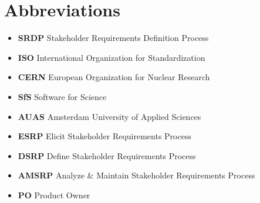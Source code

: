 \documentclass[conference]{IEEEtran}
\begin{document}




\section*{Abbreviations}

\begin{itemize}
	\item \textbf{SRDP} Stakeholder Requirements Definition Process
	\item \textbf{ISO} International Organization for Standardization
	\item \textbf{CERN} European Organization for Nuclear Research
	\item \textbf{SfS} Software for Science
	\item \textbf{AUAS} Amsterdam University of Applied Sciences
	\item \textbf{ESRP} Elicit Stakeholder Requirements Process
	\item \textbf{DSRP} Define Stakeholder Requirements Process
	\item \textbf{AMSRP} Analyze \& Maintain Stakeholder Requirements Process
	\item \textbf{PO} Product Owner
\end{itemize}
\end{document}
